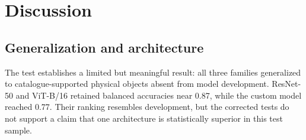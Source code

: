 \documentclass[preprint,12pt,authoryear]{elsarticle}
\begin{document}
\begin{table}[t]
\centering
\small
\caption{Paired A-view architecture comparisons. Differences are first minus
second family, averaged over the three seeds. Intervals use the paired
assignment-unit bootstrap; $p$ values use paired unit-level randomization. Holm
adjustment covers the nine displayed tests.}
\label{tab:pairedA}
\end{table}

\section{Discussion}

\subsection{Generalization and architecture}

The test establishes a limited but meaningful result: all three families generalized
to catalogue-supported physical objects absent from model development. ResNet-50
and ViT-B/16 retained balanced accuracies near 0.87, while the custom model reached
0.77. Their ranking resembles development, but the corrected tests do not support a
claim that one architecture is statistically superior in this test sample.
\end{document}
